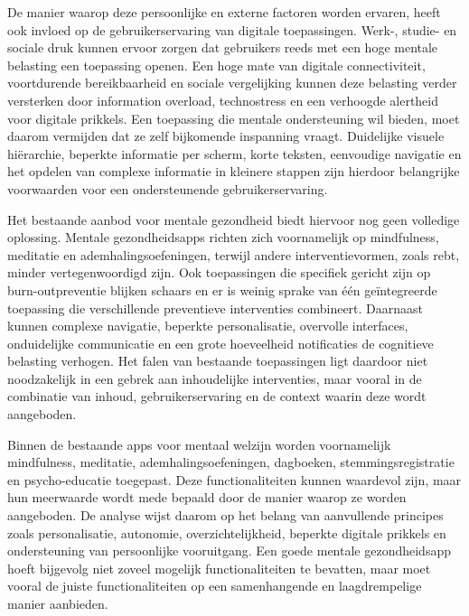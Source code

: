 \newpage

De manier waarop deze persoonlijke en externe factoren worden ervaren, heeft ook invloed op de gebruikerservaring van digitale toepassingen. Werk-, studie- en sociale druk kunnen ervoor zorgen dat gebruikers reeds met een hoge mentale belasting een toepassing openen. Een hoge mate van digitale connectiviteit, voortdurende bereikbaarheid en sociale vergelijking kunnen deze belasting verder versterken door information overload, technostress en een verhoogde alertheid voor digitale prikkels. Een toepassing die mentale ondersteuning wil bieden, moet daarom vermijden dat ze zelf bijkomende inspanning vraagt. Duidelijke visuele hiërarchie, beperkte informatie per scherm, korte teksten, eenvoudige navigatie en het opdelen van complexe informatie in kleinere stappen zijn hierdoor belangrijke voorwaarden voor een ondersteunende gebruikerservaring.

\vspace{1em}

Het bestaande aanbod voor mentale gezondheid biedt hiervoor nog geen volledige oplossing. Mentale gezondheidsapps richten zich voornamelijk op mindfulness, meditatie en ademhalingsoefeningen, terwijl andere interventievormen, zoals \acrshort{rebt}, minder vertegenwoordigd zijn. Ook toepassingen die specifiek gericht zijn op burn-outpreventie blijken schaars en er is weinig sprake van één geïntegreerde toepassing die verschillende preventieve interventies combineert. Daarnaast kunnen complexe navigatie, beperkte personalisatie, overvolle interfaces, onduidelijke communicatie en een grote hoeveelheid notificaties de cognitieve belasting verhogen. Het falen van bestaande toepassingen ligt daardoor niet noodzakelijk in een gebrek aan inhoudelijke interventies, maar vooral in de combinatie van inhoud, gebruikerservaring en de context waarin deze wordt aangeboden.

\vspace{1em}

Binnen de bestaande apps voor mentaal welzijn worden voornamelijk mindfulness, meditatie, ademhalingsoefeningen, dagboeken, stemmingsregistratie en psycho-educatie toegepast. Deze functionaliteiten kunnen waardevol zijn, maar hun meerwaarde wordt mede bepaald door de manier waarop ze worden aangeboden. De analyse wijst daarom op het belang van aanvullende principes zoals personalisatie, autonomie, overzichtelijkheid, beperkte digitale prikkels en ondersteuning van persoonlijke vooruitgang. Een goede mentale gezondheidsapp hoeft bijgevolg niet zoveel mogelijk functionaliteiten te bevatten, maar moet vooral de juiste functionaliteiten op een samenhangende en laagdrempelige manier aanbieden.

